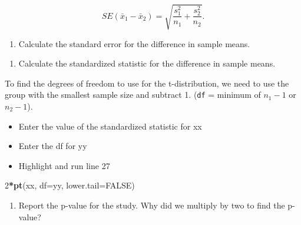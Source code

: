\documentclass[
]{report}
\newenvironment{Shaded}{\begin{snugshade}}{\end{snugshade}}
\newcommand{\AttributeTok}[1]{\textcolor[rgb]{0.13,0.29,0.53}{#1}}
\newcommand{\ConstantTok}[1]{\textcolor[rgb]{0.56,0.35,0.01}{#1}}
\newcommand{\DecValTok}[1]{\textcolor[rgb]{0.00,0.00,0.81}{#1}}
\newcommand{\FunctionTok}[1]{\textcolor[rgb]{0.13,0.29,0.53}{\textbf{#1}}}
\newcommand{\NormalTok}[1]{#1}
\newcommand{\SpecialCharTok}[1]{\textcolor[rgb]{0.81,0.36,0.00}{\textbf{#1}}}
\providecommand{\tightlist}{%
  \setlength{\itemsep}{0pt}\setlength{\parskip}{0pt}}
\begin{document}
\[SE(\bar{x}_1 -\bar{x}_2)=\sqrt{\frac{s_1^2}{n_1}+\frac{s_2^2}{n_2}}.\]

\begin{enumerate}
\def\labelenumi{\arabic{enumi}.}
\setcounter{enumi}{5}
\tightlist
\item
  Calculate the standard error for the difference in sample means.
\end{enumerate}

\vspace{0.5in}

\begin{enumerate}
\def\labelenumi{\arabic{enumi}.}
\setcounter{enumi}{6}
\tightlist
\item
  Calculate the standardized statistic for the difference in sample means.
\end{enumerate}

\vspace{0.5in}

To find the degrees of freedom to use for the t-distribution, we need to use the group with the smallest sample size and subtract 1. (\texttt{df} = minimum of \(n_1 - 1\) or \(n_2 - 1\)).

\vspace{0.2in}

\begin{itemize}
\item
  Enter the value of the standardized statistic for xx
\item
  Enter the df for yy
\item
  Highlight and run line 27
\end{itemize}

\begin{Shaded}
\begin{Highlighting}[]
\DecValTok{2}\SpecialCharTok{*}\FunctionTok{pt}\NormalTok{(xx, }\AttributeTok{df=}\NormalTok{yy, }\AttributeTok{lower.tail=}\ConstantTok{FALSE}\NormalTok{)}
\end{Highlighting}
\end{Shaded}

\vspace{0.3in}

\begin{enumerate}
\def\labelenumi{\arabic{enumi}.}
\setcounter{enumi}{7}
\tightlist
\item
  Report the p-value for the study. Why did we multiply by two to find the p-value?
\end{enumerate}

\vspace{0.5in}
\end{document}
